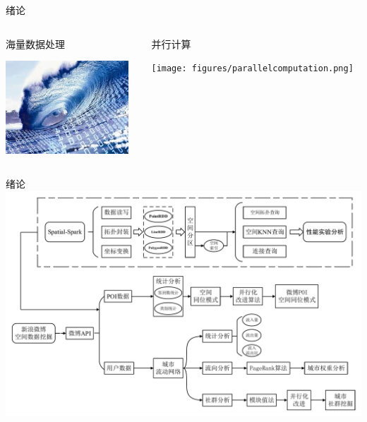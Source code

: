 \begin{frame}[t]{绪论}



\begin{columns}
    \begin{column}{0.4 \textwidth}

        \begin{center}
        \alert{海量数据处理}

        \vspace{1em}
        \includegraphics[height=3.5cm]{figures/seaamountdata.jpeg}
        \end{center}


    \end{column}

    \pause
    \begin{column}{0.6 \textwidth}

        \begin{center}
            \alert{并行计算}

            \vspace{1em}
            \texttt{[image: figures/parallelcomputation.png]}
        \end{center}
       
    \end{column}

\end{columns}




\end{frame}

\begin{frame}[c]{绪论}
    \includegraphics[scale=0.3]{figures/technology_route.pdf}
\end{frame}